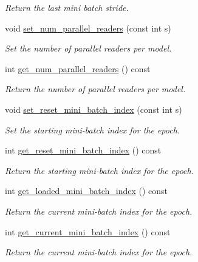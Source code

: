 \begin{DoxyCompactItemize}
\begin{DoxyCompactList}\small\item\em Return the last mini batch stride. \end{DoxyCompactList}\item 
void \hyperlink{classlbann_1_1generic__data__reader_a9b348d52852062dbc66b0accde5c6e8a}{set\+\_\+num\+\_\+parallel\+\_\+readers} (const int s)
\begin{DoxyCompactList}\small\item\em Set the number of parallel readers per model. \end{DoxyCompactList}\item 
int \hyperlink{classlbann_1_1generic__data__reader_ad15887cc31657d03925835aab0d4b675}{get\+\_\+num\+\_\+parallel\+\_\+readers} () const
\begin{DoxyCompactList}\small\item\em Return the number of parallel readers per model. \end{DoxyCompactList}\item 
void \hyperlink{classlbann_1_1generic__data__reader_a8ac14fee514ad30efe8571ce68c2a95d}{set\+\_\+reset\+\_\+mini\+\_\+batch\+\_\+index} (const int s)
\begin{DoxyCompactList}\small\item\em Set the starting mini-\/batch index for the epoch. \end{DoxyCompactList}\item 
int \hyperlink{classlbann_1_1generic__data__reader_a4df1c749c3b20e786a5f1452daa7b540}{get\+\_\+reset\+\_\+mini\+\_\+batch\+\_\+index} () const
\begin{DoxyCompactList}\small\item\em Return the starting mini-\/batch index for the epoch. \end{DoxyCompactList}\item 
int \hyperlink{classlbann_1_1generic__data__reader_a56dca946c200cc25f6eae6e507939bba}{get\+\_\+loaded\+\_\+mini\+\_\+batch\+\_\+index} () const
\begin{DoxyCompactList}\small\item\em Return the current mini-\/batch index for the epoch. \end{DoxyCompactList}\item 
int \hyperlink{classlbann_1_1generic__data__reader_a35521b27677081ee9ed30f25aeb3b508}{get\+\_\+current\+\_\+mini\+\_\+batch\+\_\+index} () const
\begin{DoxyCompactList}\small\item\em Return the current mini-\/batch index for the epoch. \end{DoxyCompactList}\item 

\end{DoxyCompactItemize}
